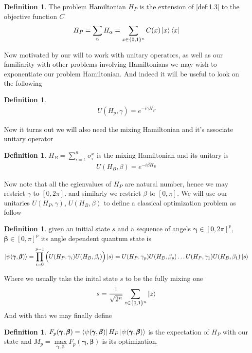 \documentclass[12pt]{amsart}
\numberwithin{equation}{section}
\theoremstyle{definition}
\newtheorem{definition}[theorem]{Definition}
\begin{document}
\begin{definition}\label{def:1.4}
The problem Hamiltonian $H_P$ is the extension of \ref{def:1.3} to the objective function $C$  \begin{align*}
    H_P=\sum_{\alpha}H_\alpha=\sum_{x\in \{0,1\}^n}C(x)\ket{x}\bra{x}
\end{align*}  
\end{definition}

Now motivated by our will to work with unitary operators, as well as our familiarity with other problems involving Hamiltonians we may wish to exponentiate our problem Hamiltonian. And indeed it will be useful to look on the following
\begin{definition}
\begin{align*}
    U(H_p,\gamma)=e^{-i\gamma H_P}
\end{align*} 
\end{definition}  
Now it turns out we will also need the mixing Hamiltonian and it's associate unitary operator \begin{definition}\label{def:1.5}
$H_B=\sum\limits_{i=1}^n \sigma_i^x$ is the mixing Hamiltonian and its unitary is \begin{align*}
    U(H_B,\beta)=e^{-i\beta H_B}
\end{align*}
\end{definition}
Now note that all the egienvalues of $H_P$ are natural number, hence we may restrict $\gamma$ to $[0,2\pi]$. and similarly we restrict $\beta$ to $[0,\pi]$. We will use our unitaries $U(H_P,\gamma)$, $U(H_B,\beta)$ to define a classical optimization problem as follow \begin{definition}\label{def:1.7}
given an initial state $s$ and a sequence of angels $\pmb{\gamma}\in [0,2\pi]^p$, $\pmb{\beta}\in [0,\pi]^p$ its angle
dependent quantum state is \begin{align*}
    \ket{\psi(\pmb{\gamma},\pmb{\beta})}=\prod_{i=0}^{p-1} \Big(U(H_P,\gamma_i)U(H_B,\beta_i)\Big)\ket{s}=U(H_P,\gamma_p)U(H_B,\beta_p)\dots U(H_P,\gamma_1)U(H_B,\beta_1)\ket{s}
\end{align*}
\end{definition} 
Where we usually take the inital state $s$ to be the fully mixing one \begin{align*}
    s=\frac{1}{\sqrt{2^n}}\sum_{z\in \{0,1\}^n}\ket{z}
\end{align*}
And with that we may finally define \begin{definition}
$F_p(\pmb{\gamma},\pmb{\beta})=  \bra{\psi(\pmb{\gamma},\pmb{\beta})}H_P\ket{\psi(\pmb{\gamma},\pmb{\beta})}$ is the expectation of $H_P$ with our state and $M_p=\max\limits_{\pmb{\gamma},\pmb{\beta}}F_p(\pmb{\gamma},\pmb{\beta})$ is its optimization.  
\end{definition}
\end{document}
